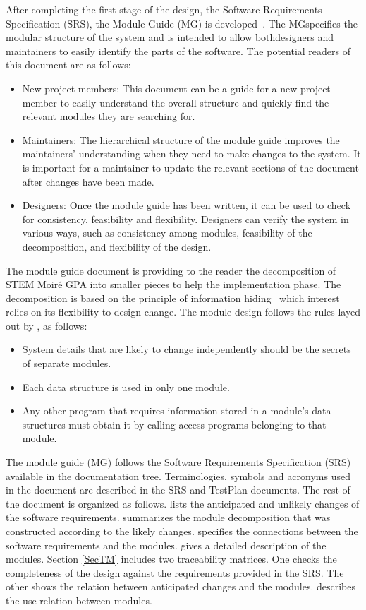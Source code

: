 \documentclass[12pt, titlepage]{article}
\newcommand{\progname}{STEM Moir{\'e} GPA}
\begin{document}
After completing the first stage of the design, the Software Requirements
Specification (SRS), the Module Guide (MG) is developed~\cite{ParnasEtAl1984}. The MGspecifies the modular structure of the system and is intended to allow bothdesigners and maintainers to easily identify the parts of the software. The
potential readers of this document are as follows:

\begin{itemize}
\item New project members: This document can be a guide for a new project member
  to easily understand the overall structure and quickly find the
  relevant modules they are searching for.
\item Maintainers: The hierarchical structure of the module guide improves the
  maintainers' understanding when they need to make changes to the system. It is
  important for a maintainer to update the relevant sections of the document
  after changes have been made.
\item Designers: Once the module guide has been written, it can be used to
  check for consistency, feasibility and flexibility. Designers can verify the
  system in various ways, such as consistency among modules, feasibility of the
  decomposition, and flexibility of the design.
\end{itemize}
\fi

The module guide document is providing to the reader the decomposition of \progname{} into smaller pieces to help the implementation phase. The decomposition is based on the principle of information hiding~\cite{Parnas1972a} which interest relies on its flexibility to design change. The module design follows the rules layed out by \cite{ParnasEtAl1984}, as follows:
\begin{itemize}
\item System details that are likely to change independently should be the
  secrets of separate modules.
\item Each data structure is used in only one module.
\item Any other program that requires information stored in a module's data
  structures must obtain it by calling access programs belonging to that module.
\end{itemize}

The module guide (MG) follows the Software Requirements Specification (SRS) available in the documentation tree. Terminologies, symbols and acronyms used in the document are described in the SRS and TestPlan documents. The rest of the document is organized as follows.  lists the anticipated and unlikely changes of the software requirements.  summarizes the module decomposition that was constructed according to the likely changes.  specifies the connections between the software requirements and the modules.  gives a detailed description of the modules. Section \cref{SecTM} includes two traceability matrices. One checks the completeness of the design against the requirements provided in the SRS. The other shows the relation between anticipated changes and the modules.  describes the use relation between modules.
\end{document}
